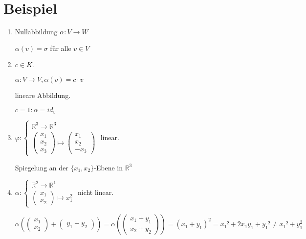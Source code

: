 \documentclass[a4paper, openany]{book}
\begin{document}
    \section{Beispiel}
    \begin{enumerate}[label=(\alph*)]
      \item Nullabbildung $\alpha: V \rightarrow W$

      $\alpha(v) = \sigma$ für alle $v \in V$

      \item $c \in K$.

      $\alpha: V \rightarrow V, \alpha(v) = c \cdot v$

      lineare Abbildung.

      $c = 1:  \alpha = id_v$

      \item $\varphi : \begin{cases}\mathbb{R}^3 \rightarrow \mathbb{R}^3 \\ \begin{pmatrix}x_1 \\ x_2 \\ x_3 \end{pmatrix} \mapsto \begin{pmatrix}x_1 \\ x_2 \\ - x_3 \end{pmatrix} \end{cases}$ linear.

      Spiegelung an der $\{x_1, x_2\}$-Ebene in $\mathbb{R}^3$

      \item $\alpha: \begin{cases}\mathbb{R}^2 \rightarrow \mathbb{R}^1 \\ \begin{pmatrix}x_1 \\ x_2 \end{pmatrix} \mapsto x_1^2 \end{cases}$ nicht linear.

      $\alpha(\begin{pmatrix}x_1 \\ x_2 \end{pmatrix} + \begin{pmatrix}y_1 + y_2 \end{pmatrix}) = \alpha(\begin{pmatrix}x_1 + y_1 \\ x_2 + y_2 \end{pmatrix}) = (x_1+y_1)^2 = x_1² + 2x_1y_1 + y_1² \neq x_1² + y_1^2$
      \end{enumerate}
\end{document}
